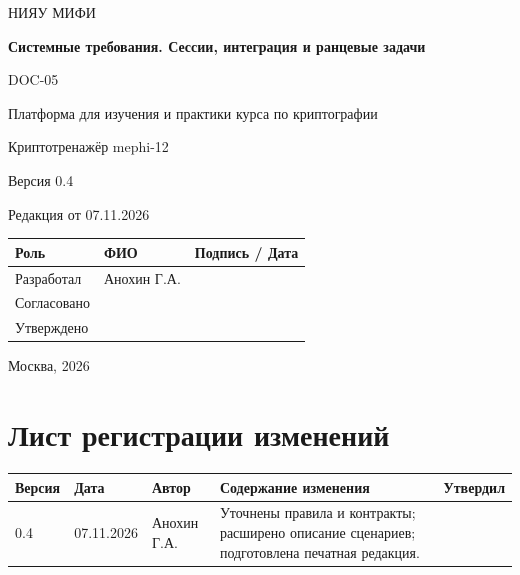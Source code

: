\documentclass[12pt,a4paper]{article}
\begin{document}
\hypersetup{pageanchor=false}
\begin{titlepage}
  \thispagestyle{empty}
  \centering
  {\large НИЯУ МИФИ\par}
  \vspace*{3.5cm}
  {\LARGE\bfseries Системные требования. Сессии, интеграция и ранцевые задачи\par}
  \vspace{0.5cm}
  {\large DOC-05\par}
  \vspace{0.6cm}
  {\large Платформа для изучения и практики курса по криптографии\par}
  {\large Криптотренажёр mephi-12\par}
  \vspace{0.7cm}
  {\large Версия 0.4\par}
  {\large Редакция от 07.11.2026\par}
  \vspace{1cm}
  \begin{tabularx}{\textwidth}{@{}p{3.4cm}Xp{4cm}@{}}
    \toprule
    Роль & ФИО & Подпись / Дата \\
    \midrule
    Разработал & Анохин Г.А. & \\
    \addlinespace[6pt]
    Согласовано & & \\
    \addlinespace[6pt]
    Утверждено & & \\
    \bottomrule
  \end{tabularx}
  \vfill
  {\large Москва, 2026\par}
\end{titlepage}
\hypersetup{pageanchor=true}

\section*{Лист регистрации изменений}
\begingroup\small\singlespacing
\noindent
\begin{tabularx}{\textwidth}{@{}p{1.2cm}p{2cm}p{2.5cm}Xp{1.8cm}@{}}
\toprule
Версия & Дата & Автор & Содержание изменения & Утвердил \\
\midrule
0.4 & 07.11.2026 & Анохин Г.А. & Уточнены правила и контракты; расширено описание сценариев; подготовлена печатная редакция. & \\
\bottomrule
\end{tabularx}
\endgroup
\clearpage
\begingroup\small\singlespacing
\tableofcontents
\endgroup
\clearpage
\end{document}
